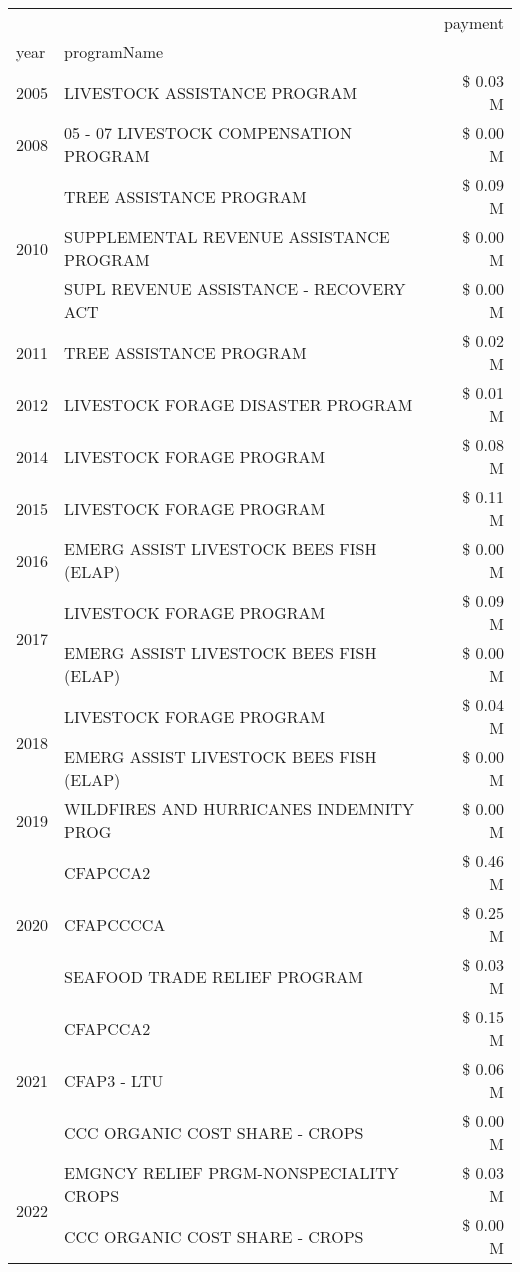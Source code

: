 \begin{tabular}{llr}
\toprule
 &  & payment \\
year & programName &  \\
\midrule
2005 & LIVESTOCK ASSISTANCE PROGRAM & \$ 0.03 M \\
\cline{1-3}
2008 & 05 - 07 LIVESTOCK COMPENSATION PROGRAM & \$ 0.00 M \\
\cline{1-3}
\multirow[t]{3}{*}{2010} & TREE ASSISTANCE PROGRAM & \$ 0.09 M \\
 & SUPPLEMENTAL REVENUE ASSISTANCE PROGRAM & \$ 0.00 M \\
 & SUPL REVENUE ASSISTANCE - RECOVERY ACT & \$ 0.00 M \\
\cline{1-3}
2011 & TREE ASSISTANCE PROGRAM & \$ 0.02 M \\
\cline{1-3}
2012 & LIVESTOCK FORAGE DISASTER PROGRAM & \$ 0.01 M \\
\cline{1-3}
2014 & LIVESTOCK FORAGE PROGRAM & \$ 0.08 M \\
\cline{1-3}
2015 & LIVESTOCK FORAGE PROGRAM & \$ 0.11 M \\
\cline{1-3}
2016 & EMERG ASSIST LIVESTOCK BEES FISH (ELAP) & \$ 0.00 M \\
\cline{1-3}
\multirow[t]{2}{*}{2017} & LIVESTOCK FORAGE PROGRAM & \$ 0.09 M \\
 & EMERG ASSIST LIVESTOCK BEES FISH (ELAP) & \$ 0.00 M \\
\cline{1-3}
\multirow[t]{2}{*}{2018} & LIVESTOCK FORAGE PROGRAM & \$ 0.04 M \\
 & EMERG ASSIST LIVESTOCK BEES FISH (ELAP) & \$ 0.00 M \\
\cline{1-3}
2019 & WILDFIRES AND HURRICANES INDEMNITY PROG & \$ 0.00 M \\
\cline{1-3}
\multirow[t]{3}{*}{2020} & CFAPCCA2 & \$ 0.46 M \\
 & CFAPCCCCA & \$ 0.25 M \\
 & SEAFOOD TRADE RELIEF PROGRAM & \$ 0.03 M \\
\cline{1-3}
\multirow[t]{3}{*}{2021} & CFAPCCA2 & \$ 0.15 M \\
 & CFAP3 - LTU & \$ 0.06 M \\
 & CCC ORGANIC COST SHARE - CROPS & \$ 0.00 M \\
\cline{1-3}
\multirow[t]{2}{*}{2022} & EMGNCY RELIEF PRGM-NONSPECIALITY CROPS & \$ 0.03 M \\
 & CCC ORGANIC COST SHARE - CROPS & \$ 0.00 M \\
\cline{1-3}
\bottomrule
\end{tabular}

